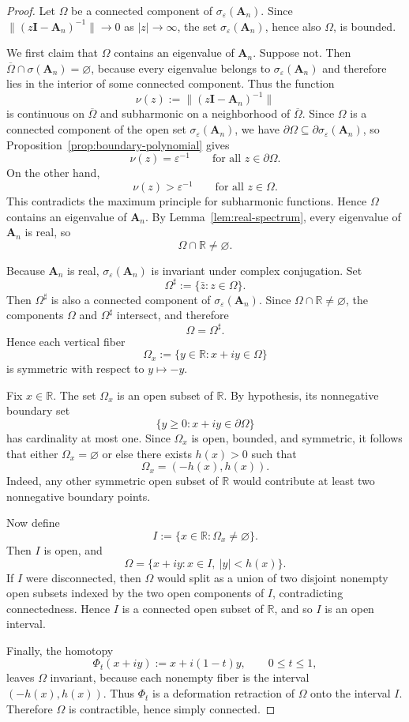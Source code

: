 \documentclass[11pt]{article}
\begin{document}
\begin{proof}
Let \(\Omega\) be a connected component of \(\sigma_\varepsilon(\mathbf{A}_n)\).
Since \(\|(z\mathbf{I}-\mathbf{A}_n)^{-1}\|\to 0\) as \(|z|\to\infty\), the set
\(\sigma_\varepsilon(\mathbf{A}_n)\), hence also \(\Omega\), is bounded.

We first claim that \(\Omega\) contains an eigenvalue of \(\mathbf{A}_n\). Suppose not.
Then \(\overline\Omega\cap\sigma(\mathbf{A}_n)=\varnothing\), because every eigenvalue belongs to
\(\sigma_\varepsilon(\mathbf{A}_n)\) and therefore lies in the interior of some connected component.
Thus the function
\[
\nu(z):=\|(z\mathbf{I}-\mathbf{A}_n)^{-1}\|
\]
is continuous on \(\overline\Omega\) and subharmonic on a neighborhood of \(\overline\Omega\).
Since \(\Omega\) is a connected component of the open set \(\sigma_\varepsilon(\mathbf{A}_n)\), we have
\(\partial\Omega\subseteq\partial\sigma_\varepsilon(\mathbf{A}_n)\), so Proposition~\ref{prop:boundary-polynomial} gives
\[
\nu(z)=\varepsilon^{-1}
\qquad \text{for all } z\in\partial\Omega.
\]
On the other hand,
\[
\nu(z)>\varepsilon^{-1}
\qquad \text{for all } z\in\Omega.
\]
This contradicts the maximum principle for subharmonic functions. Hence \(\Omega\) contains an eigenvalue of \(\mathbf{A}_n\).
By Lemma~\ref{lem:real-spectrum}, every eigenvalue of \(\mathbf{A}_n\) is real, so
\[
\Omega\cap\mathbb{R}\neq\varnothing.
\]

Because \(\mathbf{A}_n\) is real, \(\sigma_\varepsilon(\mathbf{A}_n)\) is invariant under complex conjugation. Set
\[
\Omega^{\sharp}:=\{\bar z:z\in\Omega\}.
\]
Then \(\Omega^{\sharp}\) is also a connected component of \(\sigma_\varepsilon(\mathbf{A}_n)\). Since
\(\Omega\cap\mathbb{R}\neq\varnothing\), the components \(\Omega\) and \(\Omega^{\sharp}\) intersect, and therefore
\[
\Omega=\Omega^{\sharp}.
\]
Hence each vertical fiber
\[
\Omega_x:=\{y\in\mathbb{R}:x+iy\in\Omega\}
\]
is symmetric with respect to \(y\mapsto -y\).

Fix \(x\in\mathbb{R}\). The set \(\Omega_x\) is an open subset of \(\mathbb{R}\). By hypothesis, its nonnegative boundary set
\[
\{y\ge 0:x+iy\in\partial\Omega\}
\]
has cardinality at most one. Since \(\Omega_x\) is open, bounded, and symmetric, it follows that either
\(\Omega_x=\varnothing\) or else there exists \(h(x)>0\) such that
\[
\Omega_x=(-h(x),h(x)).
\]
Indeed, any other symmetric open subset of \(\mathbb{R}\) would contribute at least two nonnegative boundary points.

Now define
\[
I:=\{x\in\mathbb{R}:\Omega_x\neq\varnothing\}.
\]
Then \(I\) is open, and
\[
\Omega=\{x+iy:x\in I,\ |y|<h(x)\}.
\]
If \(I\) were disconnected, then \(\Omega\) would split as a union of two disjoint nonempty open subsets indexed by the two open components of \(I\), contradicting connectedness. Hence \(I\) is a connected open subset of \(\mathbb{R}\), and so \(I\) is an open interval.

Finally, the homotopy
\[
\Phi_t(x+iy):=x+i(1-t)y,
\qquad 0\le t\le 1,
\]
leaves \(\Omega\) invariant, because each nonempty fiber is the interval \((-h(x),h(x))\).
Thus \(\Phi_t\) is a deformation retraction of \(\Omega\) onto the interval \(I\). Therefore \(\Omega\) is contractible, hence simply connected.
\end{proof}
\end{document}
